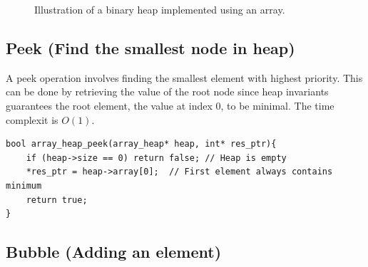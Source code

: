\documentclass[a4paper,11pt]{article}
\begin{document}
\begin{figure}[h]
\centering
{}
\caption{Illustration of a binary heap implemented using an array.}
\label{fig:arrayheap}
\end{figure}

\subsection*{Peek (Find the smallest node in heap)}

A peek operation involves finding the smallest element with highest priority. This can be done by retrieving the value of the root node since heap invariants guarantees the root element, the value at index 0, to be minimal. The time complexit is $O(1)$.

\begin{verbatim}
bool array_heap_peek(array_heap* heap, int* res_ptr){
    if (heap->size == 0) return false; // Heap is empty
    *res_ptr = heap->array[0];  // First element always contains minimum
    return true;
}
\end{verbatim}

\subsection*{Bubble (Adding an element)}
\end{document}
